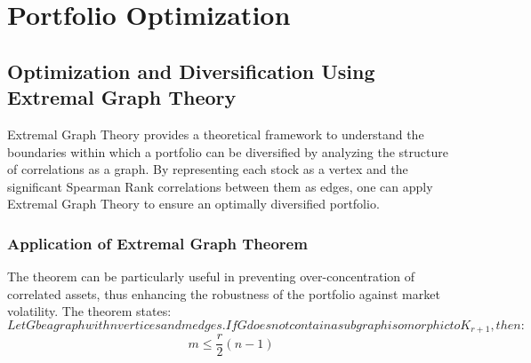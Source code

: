 \documentclass{article}
\newtheorem{theorem}{Theorem}[section]
\newtheorem{definition}[theorem]{Definition}
\begin{document}













\section{Portfolio Optimization}

\subsection{Optimization and Diversification Using Extremal Graph Theory}

Extremal Graph Theory provides a theoretical framework to understand the boundaries within which a portfolio can be diversified by analyzing the structure of correlations as a graph. By representing each stock as a vertex and the significant Spearman Rank correlations between them as edges, one can apply Extremal Graph Theory to ensure an optimally diversified portfolio.

\subsubsection{Application of Extremal Graph Theorem}

The theorem can be particularly useful in preventing over-concentration of correlated assets, thus enhancing the robustness of the portfolio against market volatility. The theorem states:
\[
{Let } G { be a graph with } n { vertices and } m { edges. If } G { does not contain a subgraph isomorphic to } K_{r+1}, { then: }
\]
\[
m \leq \frac{r}{2} (n-1)
\]
\end{document}
